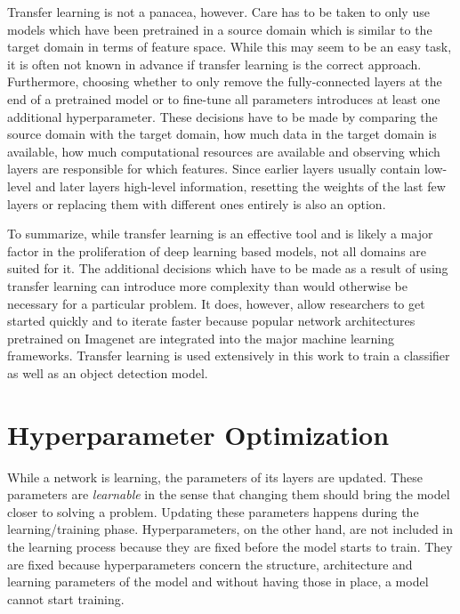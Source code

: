 \documentclass[draft,final]{vutinfth} %
\begin{document}
Transfer learning is not a panacea, however. Care has to be taken to
only use models which have been pretrained in a source domain which is
similar to the target domain in terms of feature space. While this may
seem to be an easy task, it is often not known in advance if transfer
learning is the correct approach. Furthermore, choosing whether to
only remove the fully-connected layers at the end of a pretrained
model or to fine-tune all parameters introduces at least one
additional hyperparameter. These decisions have to be made by
comparing the source domain with the target domain, how much data in
the target domain is available, how much computational resources are
available and observing which layers are responsible for which
features. Since earlier layers usually contain low-level and later
layers high-level information, resetting the weights of the last few
layers or replacing them with different ones entirely is also an
option.

To summarize, while transfer learning is an effective tool and is
likely a major factor in the proliferation of deep learning based
models, not all domains are suited for it. The additional decisions
which have to be made as a result of using transfer learning can
introduce more complexity than would otherwise be necessary for a
particular problem. It does, however, allow researchers to get started
quickly and to iterate faster because popular network architectures
pretrained on Imagenet are integrated into the major machine learning
frameworks. Transfer learning is used extensively in this work to
train a classifier as well as an object detection model.

\section{Hyperparameter Optimization}
\label{sec:background-hypopt}

While a network is learning, the parameters of its layers are
updated. These parameters are \emph{learnable} in the sense that
changing them should bring the model closer to solving a
problem. Updating these parameters happens during the
learning/training phase. Hyperparameters, on the other hand, are not
included in the learning process because they are fixed before the
model starts to train. They are fixed because hyperparameters concern
the structure, architecture and learning parameters of the model and
without having those in place, a model cannot start training.
\end{document}
